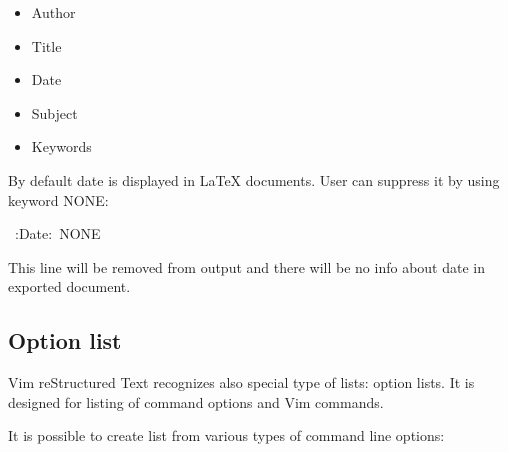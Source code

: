 \documentclass[12pt]{article}
\begin{document}
\begin{itemize}
\item
Author

\item
Title

\item
Date

\item
Subject

\item
Keywords
\end{itemize}

By default date is displayed in \LaTeX{} documents. User can suppress it by using
keyword NONE:

\begin{ttfamily}\begin{flushleft}
\mbox{~:Date:~NONE}\\
\end{flushleft}\end{ttfamily}

This line will be removed from output and there will be no info about date in
exported document.

\hypertarget{loption-list}{}
\subsection{Option list}

Vim reStructured Text recognizes also special type of lists: option lists. It is
designed for listing of command options and Vim commands.

It is possible to create list from various types of command line
options:
\end{document}
